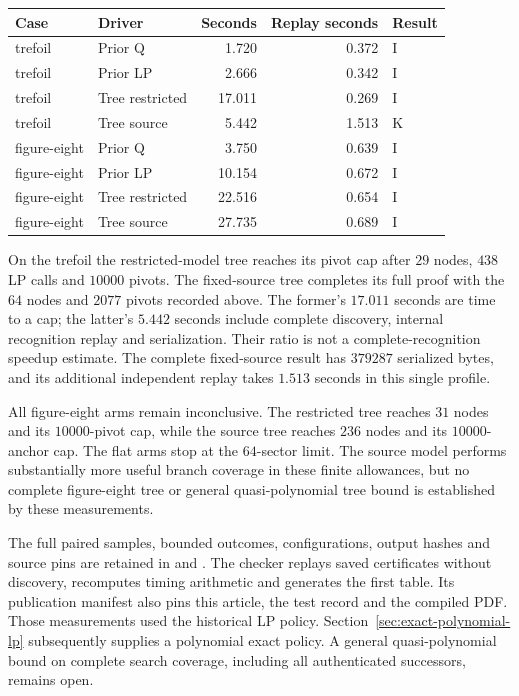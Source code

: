 \begin{center}
\small
\begin{tabular}{llrrl}
\toprule
Case & Driver & Seconds & Replay seconds & Result \\
\midrule
trefoil & Prior Q & 1.720 & 0.372 & I \\
trefoil & Prior LP & 2.666 & 0.342 & I \\
trefoil & Tree restricted & 17.011 & 0.269 & I \\
trefoil & Tree source & 5.442 & 1.513 & K \\
figure-eight & Prior Q & 3.750 & 0.639 & I \\
figure-eight & Prior LP & 10.154 & 0.672 & I \\
figure-eight & Tree restricted & 22.516 & 0.654 & I \\
figure-eight & Tree source & 27.735 & 0.689 & I \\
\bottomrule
\end{tabular}
\end{center}

On the trefoil the restricted-model tree reaches its pivot cap after $29$
nodes, $438$ LP calls and $10000$ pivots.  The fixed-source tree completes
its full proof with the $64$ nodes and $2077$ pivots recorded above.  The
former's $17.011$ seconds are time to a cap; the latter's $5.442$ seconds
include complete discovery, internal recognition replay and serialization.
Their ratio is not a complete-recognition speedup estimate.  The complete
fixed-source result has $379287$ serialized bytes, and its additional
independent replay takes $1.513$ seconds in this single profile.

All figure-eight arms remain inconclusive.  The restricted tree reaches
$31$ nodes and its $10000$-pivot cap, while the source tree reaches $236$
nodes and its $10000$-anchor cap.  The flat arms stop at the $64$-sector limit.
The source model performs substantially more useful branch coverage in
these finite allowances, but no complete figure-eight tree or general
quasi-polynomial tree bound is established by these measurements.

The full paired samples, bounded outcomes, configurations, output hashes and
source pins are retained in  and
.  The checker
 replays saved certificates
without discovery, recomputes timing arithmetic and generates the first
table.  Its publication manifest also pins this article, the test record
and the compiled PDF.  Those measurements used the historical LP policy.
Section~\ref{sec:exact-polynomial-lp} subsequently supplies a polynomial
exact policy.  A general quasi-polynomial bound on complete search coverage,
including all authenticated successors, remains open.
